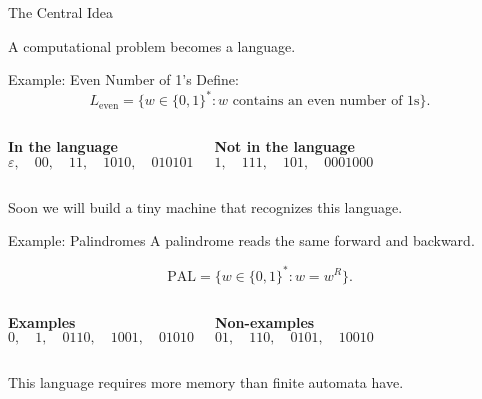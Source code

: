 \documentclass[10pt,aspectratio=169]{beamer}
\begin{document}
\begin{frame}{The Central Idea}
\begin{center}
\end{center}

\pause
\vspace{0.6em}

\begin{center}
A computational problem becomes a language.
\end{center}
\end{frame}

\begin{frame}{Example: Even Number of 1's}
Define:
\[
L_{\mathrm{even}} = \{ w \in \{0,1\}^* : w \text{ contains an even number of } 1\text{s} \}.
\]

\pause
\begin{columns}[T]
\textbf{In the language}
\[
\varepsilon,\quad 00,\quad 11,\quad 1010,\quad 010101
\]

\textbf{Not in the language}
\[
1,\quad 111,\quad 101,\quad 0001000
\]
\end{columns}

\pause
\vspace{0.6em}
\begin{center}
Soon we will build a tiny machine that recognizes this language.
\end{center}
\end{frame}

\begin{frame}{Example: Palindromes}
A palindrome reads the same forward and backward.

\pause
\[
\mathrm{PAL} = \{ w \in \{0,1\}^* : w = w^R \}.
\]

\pause
\begin{columns}[T]
\textbf{Examples}
\[
0,\quad 1,\quad 0110,\quad 1001,\quad 01010
\]

\textbf{Non-examples}
\[
01,\quad 110,\quad 0101,\quad 10010
\]
\end{columns}

\pause
\vspace{0.5em}
\begin{center}
This language requires more memory than finite automata have.
\end{center}
\end{frame}
\end{document}
